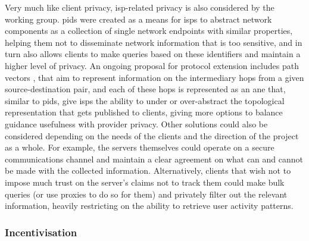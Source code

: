     Very much like client privacy, \gls{isp}-related privacy is also considered by the working group.
    \glspl{pid} were created as a means for \glspl{isp} to abstract network components as a collection of single network endpoints with similar properties, helping them not to disseminate network information that is too sensitive, and in turn also allows clients to make queries based on these identifiers and maintain a higher level of privacy.
    An ongoing proposal for protocol extension includes path vectors \cite{alto-path-vector}, that aim to represent information on the intermediary hops from a given source-destination pair, and each of these hops is represented as an \gls{ane} that, similar to \glspl{pid}, give \glspl{isp} the ability to under or over-abstract the topological representation that gets published to clients, giving more options to balance guidance usefulness with provider privacy.
    Other solutions could also be considered depending on the needs of the clients and the direction of the project as a whole.
    For example, the servers themselves could operate on a secure communications channel and maintain a clear agreement on what can and cannot be made with the collected information.
    Alternatively, clients that wish not to impose much trust on the server's claims not to track them could make bulk queries (or use proxies to do so for them) and privately filter out the relevant information, heavily restricting on the ability to retrieve user activity patterns.

\subsubsection{Incentivisation}

